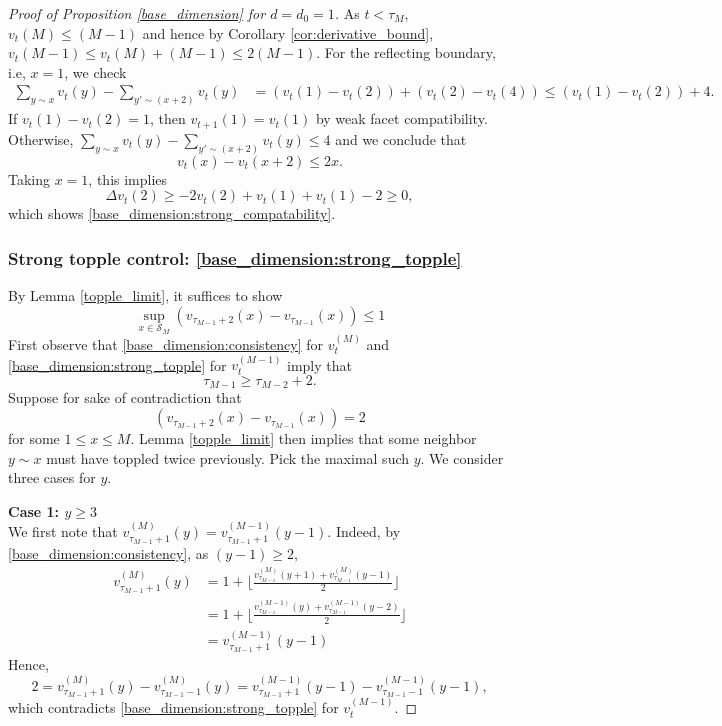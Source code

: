 \documentclass[12pt]{amsart}
\begin{document}
\begin{proof}[Proof of Proposition \ref{base_dimension} for $d=d_0 = 1$]
		As $t < \tau_M$, $v_t(M) \leq (M-1)$ and hence by Corollary \ref{cor:derivative_bound}, 
		$v_t(M-1) \leq v_{t}(M) + (M-1) \leq 2 (M-1)$. For the reflecting boundary, i.e, $x=1$, we check  
		\begin{align*}
		\sum_{y \sim x} v_t(y) - \sum_{y' \sim (x+2)} v_t(y) &= (v_t(1) - v_t(2)) + (v_t(2) - v_t(4))  \leq (v_t(1) - v_t(2)) + 4.
		\end{align*}
		If $v_t(1) - v_t(2) = 1$, then $v_{t+1}(1) = v_{t}(1)$ by weak facet compatibility. 
		Otherwise, $\sum_{y \sim x} v_t(y) - \sum_{y' \sim (x+2)} v_t(y) \leq 4$ and we conclude that 
		\[
		v_t(x) - v_t(x + 2) \leq 2 x. 
		\]
		Taking $x=1$, this implies 
		\[
		\Delta v_t(2) \geq -2 v_t(2) + v_t(1) + v_t(1) -2
		\geq 0, 
		\]
		which shows \eqref{base_dimension:strong_compatability}. 
		
		\subsubsection*{Strong topple control: \eqref{base_dimension:strong_topple}} \label{subsubsec:one_dim_strong_topple}
		By Lemma \ref{topple_limit}, it suffices to show 
		\[ 
		\sup_{x \in \mathcal{S}_M} \left(v_{\tau_{M-1}+2}(x) - v_{\tau_{M-1}}(x)\right) \leq 1
		\]
		First observe that \eqref{base_dimension:consistency} for $v_t^{(M)}$ and \eqref{base_dimension:strong_topple} for $v_t^{(M-1)}$ imply that
		\begin{equation} \label{eq:topple_time_lower_bound}
		\tau_{M-1} \geq \tau_{M-2} + 2. 
		\end{equation}
		Suppose for sake of contradiction that 
		\[
		\left(v_{\tau_{M-1}+2}(x) - v_{\tau_{M-1}}(x)\right) = 2
		\]
		for some $1 \leq x \leq M$. Lemma \ref{topple_limit} then implies
		that some neighbor $y \sim x$ must have toppled twice previously. Pick 
		the maximal such $y$.  We consider three cases for $y$. 
		
		{\bf Case 1: $y \geq 3$} \\
		We first note that $v_{\tau_{M-1}+1}^{(M)}(y) = v_{\tau_{M-1}+1}^{(M-1)}(y-1)$.
		Indeed, by \eqref{base_dimension:consistency}, as $(y-1) \geq 2$, 
		\begin{align*}
		v_{\tau_{M-1}+1}^{(M)}(y) &= 1 + \lfloor \frac{v_{\tau_{M-1}}^{(M)}(y+1) + v_{\tau_{M-1}}^{(M)}(y-1)}{2} \rfloor  \\
		&= 1 + \lfloor \frac{v_{\tau_{M-1}}^{(M-1)}(y) + v_{\tau_{M-1}}^{(M-1)}(y-2)}{2} \rfloor  \\
		&= 	v_{\tau_{M-1}+1}^{(M-1)}(y-1)
		\end{align*}
		Hence, 	
		\[
		2 = v_{\tau_{M-1}+1}^{(M)}(y)-v_{\tau_{M-1}-1}^{(M)}(y) = v_{\tau_{M-1}+1}^{(M-1)}(y-1)-v_{\tau_{M-1}-1}^{(M-1)}(y-1),
		\]
		which contradicts \eqref{base_dimension:strong_topple} for $v_t^{(M-1)}$.
		

\end{proof}
\end{document}
